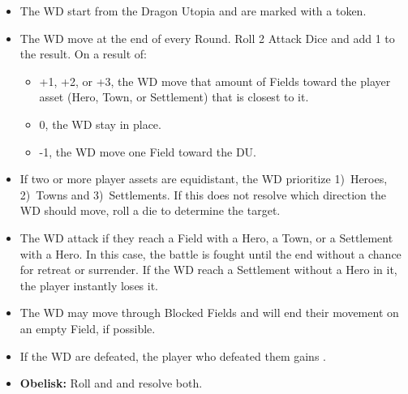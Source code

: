 \begin{multicols}{2}
\begin{itemize}
  \item The WD start from the Dragon Utopia and are marked with a  token.
  \item The WD move at the end of every Round. Roll 2 Attack Dice and add 1 to the result. On a result of:
  \begin{itemize}
    \item +1, +2, or +3, the WD move that amount of Fields toward the player asset (Hero, Town, or Settlement) that is closest to it.
    \item 0, the WD stay in place.
    \item -1, the WD move one Field toward the DU.
  \end {itemize}
  \item If two or more player assets are equidistant, the WD prioritize 1)~Heroes, 2)~Towns and 3)~Settlements.
    If this does not resolve which direction the WD should move, roll a die to determine the target.
  \item The WD attack if they reach a Field with a Hero, a Town, or a Settlement with a Hero.
    In this case, the battle is fought until the end without a chance for retreat or surrender.
    If the WD reach a Settlement without a Hero in it, the player instantly loses it.
  \item The WD may move through Blocked Fields and will end their movement on an empty Field, if possible.
  \item If the WD are defeated, the player who defeated them gains .
  \item \textbf{Obelisk:} Roll  and  and resolve both.
\end{itemize}
\end{multicols}

